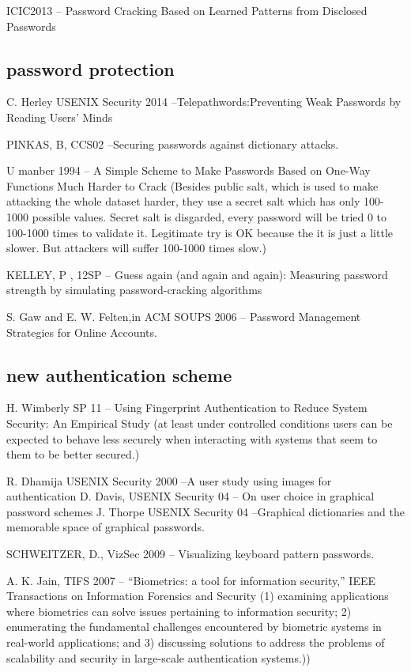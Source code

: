 \documentclass{sig-alternate}
\begin{document}
ICIC2013 -- Password Cracking Based on Learned Patterns from Disclosed Passwords 

\subsection{password protection}

C. Herley USENIX Security 2014 --Telepathwords:Preventing Weak Passwords by Reading Users’ Minds

PINKAS, B, CCS02 --Securing passwords against dictionary attacks.
 
U manber 1994 -- A Simple Scheme to Make Passwords Based on One-Way Functions Much Harder to Crack (Besides public salt, which is used to make attacking the whole dataset harder, they use a secret salt which has only 100-1000 possible values. Secret salt is disgarded, every password will be tried 0 to 100-1000 times to validate it. Legitimate try is OK because the it is just a little slower. But attackers will suffer 100-1000 times slow.)

KELLEY, P , 12SP -- Guess again (and again and again): Measuring password strength by simulating password-cracking algorithms

S. Gaw and E. W. Felten,in ACM SOUPS 2006 -- Password Management Strategies for Online Accounts.
\subsection{new authentication scheme}
H. Wimberly SP 11 -- Using Fingerprint Authentication to Reduce System Security: An Empirical Study (at least under controlled conditions users can be expected to behave less securely when interacting with systems that seem to them to be better secured.)

R. Dhamija USENIX Security 2000 --A user study using images for authentication
D. Davis, USENIX Security 04 --  On user choice in graphical password schemes
J. Thorpe USENIX Security 04 --Graphical dictionaries and the memorable space of graphical passwords.

SCHWEITZER, D., VizSec 2009 -- Visualizing keyboard pattern passwords.

A. K. Jain, TIFS 2007 -- “Biometrics: a tool for information security,” IEEE Transactions on Information Forensics and Security (1) examining applications where biometrics can solve issues pertaining to information security; 2) enumerating the fundamental challenges encountered by biometric systems in real-world applications; and 3) discussing solutions to address the problems of scalability and security in large-scale authentication systems.))
\end{document}

